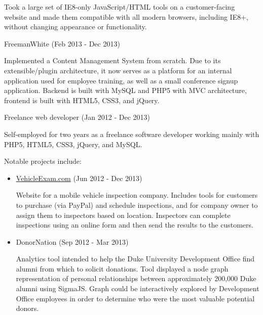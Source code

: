 \documentclass{article}
\begin{document}
    \smallskip

    Took a large set of IE8-only JavaScript/HTML tools on a customer-facing website and made them compatible with all modern browsers, including IE8+, without changing appearance or functionality.


    \bigskip\bigskip

    {
        \large
        FreemanWhite 
        {
            \color{fade-gray}
            \small
            (Feb 2013 - Dec 2013)
        }
    }

    \medskip

    Implemented a Content Management System from scratch. Due to its extensible/plugin architecture, it now serves as a platform for an internal application used for employee training, as well as a small conference signup application. Backend is built with MySQL and PHP5 with MVC architecture, frontend is built with HTML5, CSS3, and jQuery.


    \bigskip\bigskip

    {
        \large
        Freelance web developer 
        {
            \color{fade-gray}
            \small
            (Jan 2012 - Dec 2013)
        }
    }

    \medskip

    Self-employed for two years as a freelance software developer working mainly with PHP5, HTML5, CSS3, jQuery, and MySQL. 
    
    \smallskip

    Notable projects include:

    \begin{itemize}
        \item \href{http://vehicleexam.com}{VehicleExam.com}
        {
            \color{fade-gray}
            \small
            (Jun 2012 - Dec 2013)
        }

        Website for a mobile vehicle inspection company. Includes tools for customers to purchase (via PayPal) and schedule inspections, and for company owner to assign them to inspectors based on location. Inspectors can complete inspections using an online form and then send the results to the customers.

        \item DonorNation
        {
            \color{fade-gray}
            \small
            (Sep 2012 - Mar 2013)
        }

        Analytics tool intended to help the Duke University Development Office find alumni from which to solicit donations. Tool displayed a node graph representation of personal relationships between approximately 200,000 Duke alumni using SigmaJS. Graph could be interactively explored by Development Office employees in order to determine who were the most valuable potential donors.

    \end{itemize}
\end{document}
